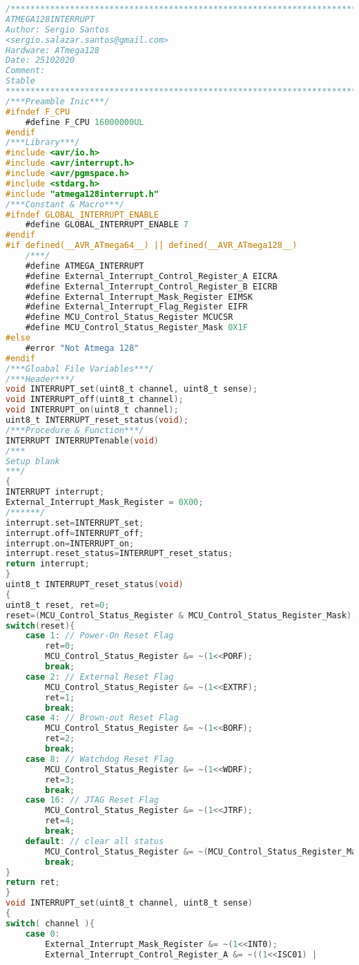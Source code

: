 \begin{lstlisting}[language=C, caption={atmega128interrupt.c}, label=atmega128interrupt-c, captionpos=b]
/*************************************************************************
ATMEGA128INTERRUPT
Author: Sergio Santos 
<sergio.salazar.santos@gmail.com>
Hardware: ATmega128
Date: 25102020
Comment:
Stable
*************************************************************************/
/***Preamble Inic***/
#ifndef F_CPU
	#define F_CPU 16000000UL
#endif
/***Library***/
#include <avr/io.h>
#include <avr/interrupt.h>
#include <avr/pgmspace.h>
#include <stdarg.h>
#include "atmega128interrupt.h"
/***Constant & Macro***/
#ifndef GLOBAL_INTERRUPT_ENABLE
	#define GLOBAL_INTERRUPT_ENABLE 7
#endif
#if defined(__AVR_ATmega64__) || defined(__AVR_ATmega128__)	
	/***/
	#define ATMEGA_INTERRUPT
	#define External_Interrupt_Control_Register_A EICRA
	#define External_Interrupt_Control_Register_B EICRB
	#define External_Interrupt_Mask_Register EIMSK
	#define External_Interrupt_Flag_Register EIFR
	#define MCU_Control_Status_Register MCUCSR
	#define MCU_Control_Status_Register_Mask 0X1F
#else
	#error "Not Atmega 128"
#endif
/***Gloabal File Variables***/
/***Header***/
void INTERRUPT_set(uint8_t channel, uint8_t sense);
void INTERRUPT_off(uint8_t channel);
void INTERRUPT_on(uint8_t channel);
uint8_t INTERRUPT_reset_status(void);
/***Procedure & Function***/
INTERRUPT INTERRUPTenable(void)
/***
Setup blank
***/
{
INTERRUPT interrupt;
External_Interrupt_Mask_Register = 0X00;
/******/
interrupt.set=INTERRUPT_set;
interrupt.off=INTERRUPT_off;
interrupt.on=INTERRUPT_on;
interrupt.reset_status=INTERRUPT_reset_status;
return interrupt;
}
uint8_t INTERRUPT_reset_status(void)
{
uint8_t reset, ret=0;
reset=(MCU_Control_Status_Register & MCU_Control_Status_Register_Mask);
switch(reset){
	case 1: // Power-On Reset Flag
		ret=0;
		MCU_Control_Status_Register &= ~(1<<PORF);
		break;
	case 2: // External Reset Flag
		MCU_Control_Status_Register &= ~(1<<EXTRF);
		ret=1;
		break;
	case 4: // Brown-out Reset Flag
		MCU_Control_Status_Register &= ~(1<<BORF);
		ret=2;
		break;
	case 8: // Watchdog Reset Flag
		MCU_Control_Status_Register &= ~(1<<WDRF);
		ret=3;
		break;
	case 16: // JTAG Reset Flag
		MCU_Control_Status_Register &= ~(1<<JTRF);
		ret=4;
		break;
	default: // clear all status
		MCU_Control_Status_Register &= ~(MCU_Control_Status_Register_Mask);
		break;
}
return ret;
}
void INTERRUPT_set(uint8_t channel, uint8_t sense)
{
switch( channel ){
	case 0: 
		External_Interrupt_Mask_Register &= ~(1<<INT0);
		External_Interrupt_Control_Register_A &= ~((1<<ISC01) |

\end{lstlisting}
